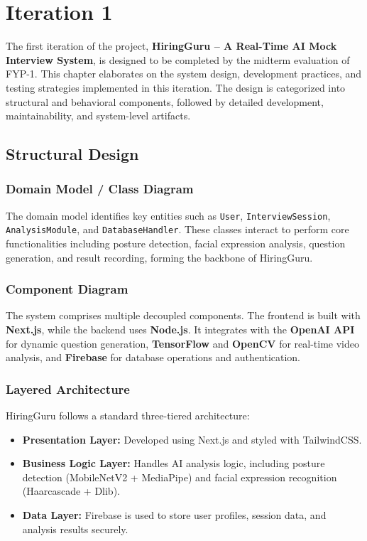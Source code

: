 \chapter{Iteration 1}
\label{ch:iter1}

The first iteration of the project, \textbf{HiringGuru – A Real-Time AI Mock Interview System}, is designed to be completed by the midterm evaluation of FYP-1. This chapter elaborates on the system design, development practices, and testing strategies implemented in this iteration. The design is categorized into structural and behavioral components, followed by detailed development, maintainability, and system-level artifacts.

\section{Structural Design}

\subsection{Domain Model / Class Diagram}
The domain model identifies key entities such as \texttt{User}, \texttt{InterviewSession}, \texttt{AnalysisModule}, and \texttt{DatabaseHandler}. These classes interact to perform core functionalities including posture detection, facial expression analysis, question generation, and result recording, forming the backbone of HiringGuru.

\subsection{Component Diagram}
The system comprises multiple decoupled components. The frontend is built with \textbf{Next.js}, while the backend uses \textbf{Node.js}. It integrates with the \textbf{OpenAI API} for dynamic question generation, \textbf{TensorFlow} and \textbf{OpenCV} for real-time video analysis, and \textbf{Firebase} for database operations and authentication.

\subsection{Layered Architecture}
HiringGuru follows a standard three-tiered architecture:

\begin{itemize}
  \item \textbf{Presentation Layer:} Developed using Next.js and styled with TailwindCSS.
  \item \textbf{Business Logic Layer:} Handles AI analysis logic, including posture detection (MobileNetV2 + MediaPipe) and facial expression recognition (Haarcascade + Dlib).
  \item \textbf{Data Layer:} Firebase is used to store user profiles, session data, and analysis results securely.
\end{itemize}

